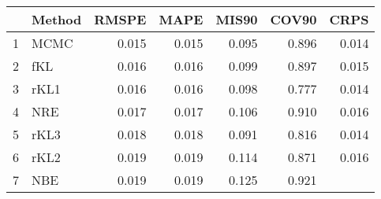 \documentclass[12pt]{article}
\begin{document}
\thispagestyle{empty}
\begin{table}[ht]
\centering
\begin{tabular}{rlrrrrr}
  \hline
 & Method & RMSPE & MAPE & MIS90 & COV90 & CRPS \\ 
  \hline
1 & MCMC & 0.015 & 0.015 & 0.095 & 0.896 & 0.014 \\ 
  2 & fKL & 0.016 & 0.016 & 0.099 & 0.897 & 0.015 \\ 
  3 & rKL1 & 0.016 & 0.016 & 0.098 & 0.777 & 0.014 \\ 
  4 & NRE & 0.017 & 0.017 & 0.106 & 0.910 & 0.016 \\ 
  5 & rKL3 & 0.018 & 0.018 & 0.091 & 0.816 & 0.014 \\ 
  6 & rKL2 & 0.019 & 0.019 & 0.114 & 0.871 & 0.016 \\ 
  7 & NBE & 0.019 & 0.019 & 0.125 & 0.921 &  \\ 
   \hline
\end{tabular}
\end{table}
\end{document}
